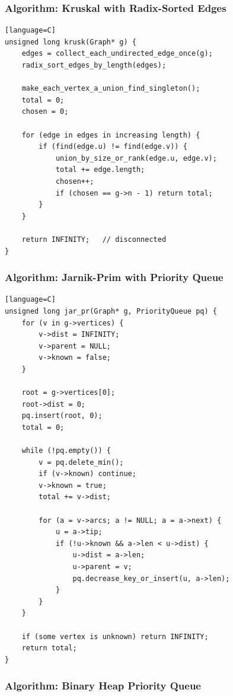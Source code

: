 \documentclass[11pt]{article}
\begin{document}
\subsubsection{Algorithm: Kruskal with Radix-Sorted Edges}\label{algorithm-kruskal-with-radix-sorted-edges}

\begin{verbatim}[language=C]
unsigned long krusk(Graph* g) {
    edges = collect_each_undirected_edge_once(g);
    radix_sort_edges_by_length(edges);

    make_each_vertex_a_union_find_singleton();
    total = 0;
    chosen = 0;

    for (edge in edges in increasing length) {
        if (find(edge.u) != find(edge.v)) {
            union_by_size_or_rank(edge.u, edge.v);
            total += edge.length;
            chosen++;
            if (chosen == g->n - 1) return total;
        }
    }

    return INFINITY;   // disconnected
}
\end{verbatim}

\subsubsection{Algorithm: Jarnik-Prim with Priority Queue}\label{algorithm-jarnik-prim-with-priority-queue}

\begin{verbatim}[language=C]
unsigned long jar_pr(Graph* g, PriorityQueue pq) {
    for (v in g->vertices) {
        v->dist = INFINITY;
        v->parent = NULL;
        v->known = false;
    }

    root = g->vertices[0];
    root->dist = 0;
    pq.insert(root, 0);
    total = 0;

    while (!pq.empty()) {
        v = pq.delete_min();
        if (v->known) continue;
        v->known = true;
        total += v->dist;

        for (a = v->arcs; a != NULL; a = a->next) {
            u = a->tip;
            if (!u->known && a->len < u->dist) {
                u->dist = a->len;
                u->parent = v;
                pq.decrease_key_or_insert(u, a->len);
            }
        }
    }

    if (some vertex is unknown) return INFINITY;
    return total;
}
\end{verbatim}

\subsubsection{Algorithm: Binary Heap Priority Queue}\label{algorithm-binary-heap-priority-queue}
\end{document}
